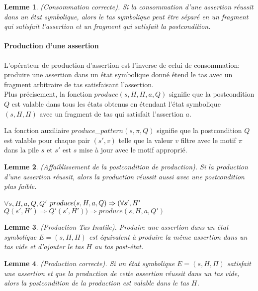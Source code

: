 \documentclass[11pt,openany]{article}
\newtheorem{lemme}{Lemme}
\begin{document}
	\begin{lemme}
		(Consommation correcte). Si la consommation d'une assertion r\'eussit dans un \'etat symbolique, alors le tas symbolique peut \^etre s\'epar\'e en un fragment qui satisfait l'assertion et un fragment qui satisfait la postcondition.
	\end{lemme}
			\paragraph{Production d'une assertion}
		L'op\'erateur de production d'assertion est l'inverse de celui de consommation: produire une assertion dans un \'etat symbolique donn\'e \'etend le tas avec un fragment arbitraire de tas satisfaisant l'assertion.\\
		Plus pr\'ecisement, la fonction $produce(s,H,\Pi,a,Q)$ signifie que la postcondition $Q$ est valable  dans tous les \'etats obtenus en \'etendant l'\'etat symbolique $(s, H, \Pi)$ avec un fragment de tas qui satisfait l'assertion $a$.
		
		La fonction auxiliaire $produce$_$pattern(s,\pi,Q)$ signifie que la postcondition $Q$ est valable pour chaque pair $(s',v)$ telle que la valeur $v$ filtre avec le motif $\pi$ dans la pile $s$ et $s'$ est $s$ mise \`a jour avec le motif appropri\'e.
		
		\begin{lemme}
			(Affaiblissement de la postcondition de production). Si la production d'une assertion r\'eussit, alors la production r\'eussit aussi avec une postcondition plus faible.
			
$\forall s,H,a,Q,Q'$ $produce(s,H,a,Q)\Rightarrow\\(\forall s', H'$ $Q(s',H')\Rightarrow Q'(s',H'))\Rightarrow produce(s,H,a,Q')$
		\end{lemme}	
		
		\begin{lemme}
		(Production Tas Inutile). Produire une assertion dans un \'etat symbolique $E = (s,H,\Pi)$  est \'equivalent \`a produire la m\^eme assertion dans un tas vide et d'ajouter le tas $H$ au tas post-\'etat.
		\end{lemme}
	
		\begin{lemme}
		(Production correcte). Si un \'etat symbolique $E=(s,H,\Pi)$ satisfait une assertion et que la production de cette assertion r\'eussit dans un tas vide, alors la postcondition de la production est valable dans le tas $H$.
		\end{lemme}
		
\end{document}

